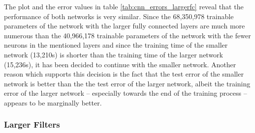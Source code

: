 \documentclass[11pt, a4paper]{article}
\begin{document}
The plot and the error values in table \ref{tab:cnn_errors_largerfc} reveal that the performance of both networks is very similar. Since the 68,350,978 trainable parameters of the network with the larger fully connected layers are much more numerous than the 40,966,178 trainable parameters of the network with the fewer neurons in the mentioned layers and since the training time of the smaller network (13,210s) is shorter than the training time of the larger network (15,236s), it has been decided to continue with the smaller network. Another reason which supports this decision is the fact that the test error of the smaller network is better than the the test error of the larger network, albeit the training error of the larger network -- especially towards the end of the training process -- appears to be marginally better.



\subsubsection{Larger Filters}
\label{subsubsec:largerfilters}
\end{document}
